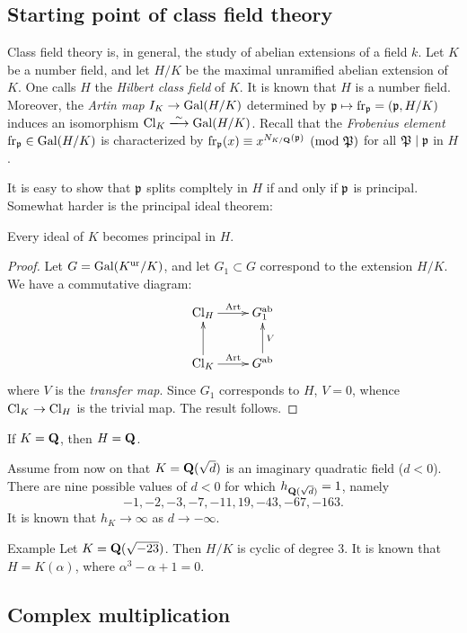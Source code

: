 \subsection{Starting point of class field theory}

Class field theory is, in general, the study of abelian extensions of a field 
$k$. Let $K$ be a number field, and let $H/K$ be the maximal unramified 
abelian extension of $K$. One calls $H$ the \emph{Hilbert class field} of 
$K$. It is known that $H$ is a number field. Moreover, the \emph{Artin map} 
$I_K \to \operatorname{Gal}(H/K)$ determined by $\mathfrak{p}\mapsto \operatorname{fr}_{\mathfrak{p}} = (\mathfrak{p},H/K)$ 
induces an isomorphism $\class_K\iso \galois(H/K)$. Recall that the 
\emph{Frobenius element} $\operatorname{fr}_{\mathfrak{p}}\in \operatorname{Gal}(H/K)$ is characterized by 
$\operatorname{fr}_{\mathfrak{p}}(x)\equiv x^{N_{K/\mathbf{Q}}(\mathfrak{p})}\pmod{\mathfrak{P}}$ for all $\mathfrak{P}\mid \mathfrak{p}$ in 
$H$. 

It is easy to show that $\mathfrak{p}$ splits compltely in $H$ if and only if $\mathfrak{p}$ is 
principal. Somewhat harder is the principal ideal theorem: 

\begin{theo}
Every ideal of $K$ becomes principal in $H$. 
\end{theo}
\begin{proof}
Let $G=\operatorname{Gal}(K^\mathrm{ur}/K)$, and let $G_1\subset G$ correspond to the 
extension $H/K$. We have a commutative diagram: 
\[\xymatrix{
  \class_H \ar[r]^-{\artin} 
    & G_1^\abelian \\
  \class_K \ar[u] \ar[r]^-{\artin}
    & G^\abelian \ar[u]_-V 
}\]
where $V$ is the \emph{transfer map}. Since $G_1$ corresponds to $H$, 
$V=0$, whence $\operatorname{Cl}_K\to \operatorname{Cl}_H$ is the trivial map. The result 
follows. 
\end{proof}

If $K=\mathbf{Q}$, then $H=\mathbf{Q}$. 

Assume from now on that $K=\mathbf{Q}(\sqrt d)$ is an imaginary quadratic field 
($d<0$). There are nine possible values of $d<0$ for which 
$h_{\mathbf{Q}(\sqrt d)}=1$, namely 
\[
  -1,-2,-3,-7,-11,19,-43,-67,-163 .
\]
It is known that $h_K\to \infty$ as $d\to -\infty$. 

\begin{enonce}[remark]{Example}
Let $K=\mathbf{Q}(\sqrt{-23})$. Then $H/K$ is cyclic of degree $3$. It is known 
that $H=K(\alpha)$, where $\alpha^3-\alpha+1=0$. 
\end{enonce}





\subsection{Complex multiplication}

